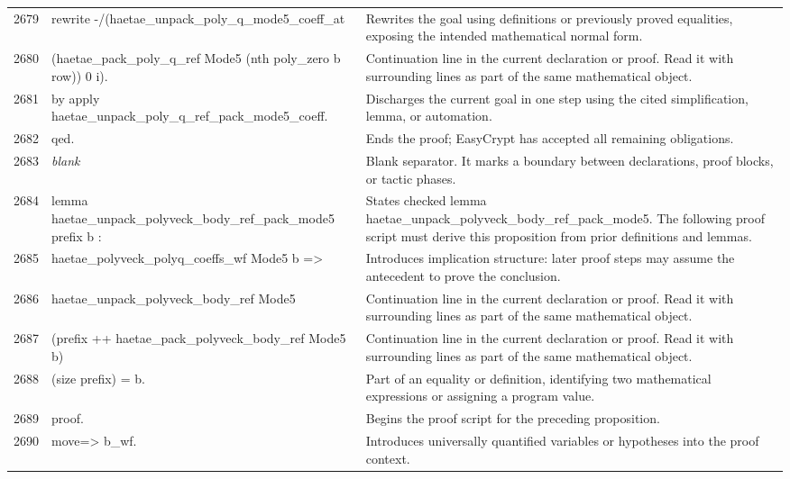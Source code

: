 \documentclass[10pt]{article}
\begin{document}
\begin{longtable}{r L{0.53\textwidth} L{0.37\textwidth}}
2679 & {\ttfamily\scriptsize rewrite -/(haetae\_unpack\_poly\_q\_mode5\_coeff\_at} & Rewrites the goal using definitions or previously proved equalities, exposing the intended mathematical normal form. \\
2680 & {\ttfamily\scriptsize   (haetae\_pack\_poly\_q\_ref Mode5 (nth poly\_zero b row)) 0 i).} & Continuation line in the current declaration or proof.  Read it with surrounding lines as part of the same mathematical object. \\
2681 & {\ttfamily\scriptsize by apply haetae\_unpack\_poly\_q\_ref\_pack\_mode5\_coeff.} & Discharges the current goal in one step using the cited simplification, lemma, or automation. \\
2682 & {\ttfamily\scriptsize qed.} & Ends the proof; EasyCrypt has accepted all remaining obligations. \\
2683 & {\ttfamily\scriptsize \emph{blank}} & Blank separator.  It marks a boundary between declarations, proof blocks, or tactic phases. \\
2684 & {\ttfamily\scriptsize lemma haetae\_unpack\_polyveck\_body\_ref\_pack\_mode5 prefix b :} & States checked lemma haetae\_unpack\_polyveck\_body\_ref\_pack\_mode5.  The following proof script must derive this proposition from prior definitions and lemmas. \\
2685 & {\ttfamily\scriptsize   haetae\_polyveck\_polyq\_coeffs\_wf Mode5 b =>} & Introduces implication structure: later proof steps may assume the antecedent to prove the conclusion. \\
2686 & {\ttfamily\scriptsize   haetae\_unpack\_polyveck\_body\_ref Mode5} & Continuation line in the current declaration or proof.  Read it with surrounding lines as part of the same mathematical object. \\
2687 & {\ttfamily\scriptsize     (prefix ++ haetae\_pack\_polyveck\_body\_ref Mode5 b)} & Continuation line in the current declaration or proof.  Read it with surrounding lines as part of the same mathematical object. \\
2688 & {\ttfamily\scriptsize     (size prefix) = b.} & Part of an equality or definition, identifying two mathematical expressions or assigning a program value. \\
2689 & {\ttfamily\scriptsize proof.} & Begins the proof script for the preceding proposition. \\
2690 & {\ttfamily\scriptsize move=> b\_wf.} & Introduces universally quantified variables or hypotheses into the proof context. \\

\end{longtable}
\end{document}
